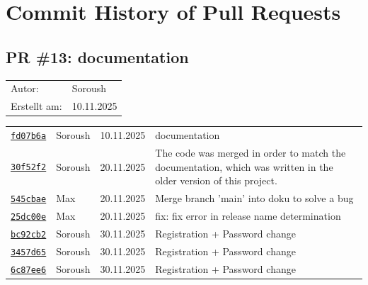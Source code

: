 \documentclass{article}%
\begin{document}
%
\section{Commit History of Pull Requests}%
\label{sec:CommitHistoryofPullRequests}%
\subsection{PR \#13: documentation}%
\label{pr:13}%
\begin{tabular}{l l}%
Autor:&Soroush\\%
Erstellt am: &10.11.2025\\%
\end{tabular}%
\begin{longtable}{l l l p{12cm}}%
\href{https://github.com/scriptor1000/homeworks/pull/13/commits/fd07b6a4f9ea2022fc1a6a9be3d26f1655277c4f}{\underline{\texttt{fd07b6a}}}&Soroush&10.11.2025&documentation\\%
\href{https://github.com/scriptor1000/homeworks/pull/13/commits/30f52f2b1bc13e1fe8ee55809fc031e9cc19017f}{\underline{\texttt{30f52f2}}}&Soroush&20.11.2025&The code was merged in order to match the documentation, which was written in the older version of this project.\\%
\href{https://github.com/scriptor1000/homeworks/pull/13/commits/545cbaee40893f7f2df79fbc5d13e4b224b9de9f}{\underline{\texttt{545cbae}}}&Max&20.11.2025&Merge branch 'main' into doku to solve a bug\\%
\href{https://github.com/scriptor1000/homeworks/pull/13/commits/25dc00e723674e876311d6195092dd384bd880d3}{\underline{\texttt{25dc00e}}}&Max&20.11.2025&fix: fix error in release name determination\\%
\href{https://github.com/scriptor1000/homeworks/pull/13/commits/bc92cb29ef32d5fe9fcf9f54254ddd614cb3bebe}{\underline{\texttt{bc92cb2}}}&Soroush&30.11.2025&Registration + Password change\\%
\href{https://github.com/scriptor1000/homeworks/pull/13/commits/3457d65b6ed5615bf84be5cd6e0b4f12a762f53d}{\underline{\texttt{3457d65}}}&Soroush&30.11.2025&Registration + Password change\\%
\href{https://github.com/scriptor1000/homeworks/pull/13/commits/6c87ee631105c16e138f039a21cc16ff7676ddd0}{\underline{\texttt{6c87ee6}}}&Soroush&30.11.2025&Registration + Password change\\%
\end{longtable}

%
\end{document}

